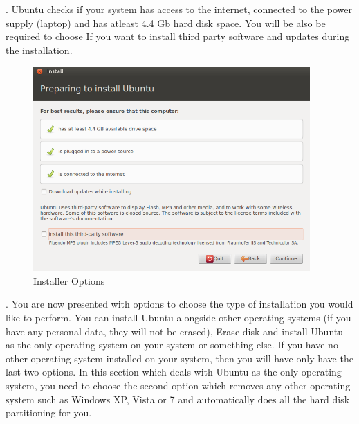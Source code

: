 \par {}. Ubuntu checks if your system has access to the internet, connected to the power supply (laptop) and has atleast 4.4 Gb hard disk space. You will be also be required to choose If you want to install third party software and updates  during the installation. %

\begin{figure}[!h]	
	\begin{center}
	\includegraphics[width=300pt]{./images/installation/installer-prepare.png}
	\caption{Installer Options}	
	\label{fig:installer-prepares}	
	\end{center}
\end{figure}

\par {}. You are now presented with options to choose the type of installation you would like to perform. You can install Ubuntu alongside other operating systems (if you have any personal data, they will not be erased), Erase disk and install Ubuntu as the only operating system on your system or something else. If you have no other operating system installed on your system, then you will have only have the last two options. In this section which deals with Ubuntu as the only operating system, you need to choose the second option which removes any other operating system such as Windows XP, Vista or 7 and automatically does all the hard disk partitioning for you. \\

